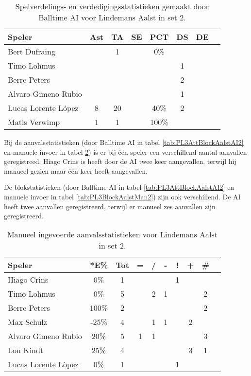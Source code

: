 \begin{table}[ht!]
  \centering
  \scriptsize
  \begin{tabular}{|l|c|c|c|c|c|c|c|} \hline
    \textbf{Speler} & Ast & TA & SE & PCT & DS & DE \\ \hline
    Bert Dufraing &  & 1 &  & 0\% &  &  \\
    Timo Lohmus &   &   &   &   & 1  &   \\
    Berre Peters &   &   &   &   &  2 &   \\
    Alvaro Gimeno Rubio &  &  &  &  & 1 &   \\
    Lucas Lorente López & 8 & 20 &  & 40\% & 2 &  \\
    Matis Verwimp & 1 & 1 &  & 100\% &   &   \\ \hline
  \end{tabular}
  \caption[Spelverdelings- en verdedigingsstatistieken gemaakt door Balltime AI voor Lindemans Aalst in set 2]{\label{tab:PL3SetDigAalstAI2}Spelverdelings- en verdedigingsstatistieken gemaakt door Balltime AI voor Lindemans Aalst in set 2.}
\end{table}

Bij de aanvalsstatistieken (door Balltime AI in tabel \ref{tab:PL3AttBlockAalstAI2} en manuele invoer in tabel \ref{tab:PL3AttAalstMan2}) is er bij één speler een verschillend aantal aanvallen geregistreed. Hiago Crins is heeft door de AI twee keer aangevallen, terwijl hij manueel gezien maar één keer heeft aangevallen.

De blokstatistieken (door Balltime AI in tabel \ref{tab:PL3AttBlockAalstAI2} en manuele invoer in tabel \ref{tab:PL3BlockAalstMan2}) zijn ook verschillend. De AI heeft twee aanvallen geregistreerd, terwijl er manueel zes aanvallen zijn geregistreerd. 

\begin{table}[ht!]
    \centering
    \scriptsize
    \begin{tabular}{|l|c|c|c|c|c|c|c|c|c|}
        \hline
        \textbf{Speler} & *E\% & Tot & = & / & - & ! & + & \# \\ \hline
        Hiago Crins & 0\% & 1 &  &  &  & 1 &  & \\ 
        Timo Lohmus & 0\% & 5 &  & 2 & 1 &  & & 2 \\ 
        Berre Peters & 100\% & 2 &  &  & & & & 2 \\ 
        Max Schulz & -25\% & 4 &  & 1 & 1 &  & 2 & \\ 
        Alvaro Gimeno Rubio & 20\% & 5 & 1 & 1 &  &  &  & 3 \\ 
        Lou Kindt & 25\% & 4 &  &  &  &  & 3 & 1 \\
        Lucas Lorente Lòpez & 0\% & 1 &  &  &  & 1 &  & \\ \hline
    \end{tabular}
    \caption[Manueel ingevoerde aanvalsstatistieken voor Lindemans Aalst in set 2]{\label{tab:PL3AttAalstMan2}Manueel ingevoerde aanvalsstatistieken voor Lindemans Aalst in set 2.}
\end{table}

